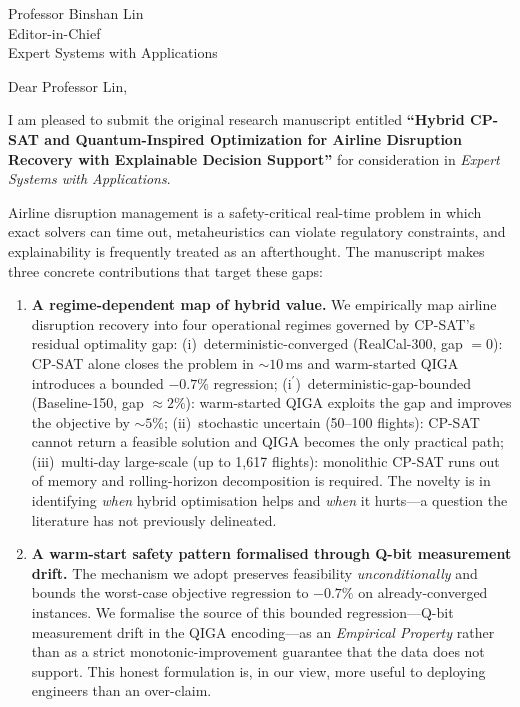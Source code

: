 \documentclass[12pt]{letter}
\begin{document}
\begin{letter}{Professor Binshan Lin \\ Editor-in-Chief \\ Expert Systems with Applications}

\opening{Dear Professor Lin,}

I am pleased to submit the original research manuscript entitled \textbf{``Hybrid CP-SAT and Quantum-Inspired Optimization for Airline Disruption Recovery with Explainable Decision Support''} for consideration in \textit{Expert Systems with Applications}.

Airline disruption management is a safety-critical real-time problem in which exact solvers can time out, metaheuristics can violate regulatory constraints, and explainability is frequently treated as an afterthought. The manuscript makes three concrete contributions that target these gaps:

\begin{enumerate}
    \item \textbf{A regime-dependent map of hybrid value.} We empirically map airline disruption recovery into four operational regimes governed by CP-SAT's residual optimality gap: (i)~deterministic-converged (RealCal-300, gap $= 0$): CP-SAT alone closes the problem in ${\sim}10$\,ms and warm-started QIGA introduces a bounded $-0.7\%$ regression; (i$^\prime$)~deterministic-gap-bounded (Baseline-150, gap ${\approx}2\%$): warm-started QIGA exploits the gap and improves the objective by ${\sim}5\%$; (ii)~stochastic uncertain (50--100 flights): CP-SAT cannot return a feasible solution and QIGA becomes the only practical path; (iii)~multi-day large-scale (up to 1{,}617 flights): monolithic CP-SAT runs out of memory and rolling-horizon decomposition is required. The novelty is in identifying \emph{when} hybrid optimisation helps and \emph{when} it hurts---a question the literature has not previously delineated.

    \item \textbf{A warm-start safety pattern formalised through Q-bit measurement drift.} The mechanism we adopt preserves feasibility \emph{unconditionally} and bounds the worst-case objective regression to $-0.7\%$ on already-converged instances. We formalise the source of this bounded regression---Q-bit measurement drift in the QIGA encoding---as an \emph{Empirical Property} rather than as a strict monotonic-improvement guarantee that the data does not support. This honest formulation is, in our view, more useful to deploying engineers than an over-claim.


\end{enumerate}
\end{letter}
\end{document}
